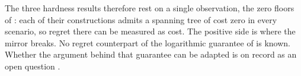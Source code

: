 The three hardness results therefore rest on a single observation, the zero floors of : each of their constructions admits a spanning tree of cost zero in every scenario, so regret there can be measured as cost.
The positive side is where the mirror breaks.
No regret counterpart of the logarithmic guarantee of  is known.
Whether the argument behind that guarantee can be adapted is on record as an open question \cite[Open Problem~1]{Goerigk2021RCO}.


%
%
%
%
